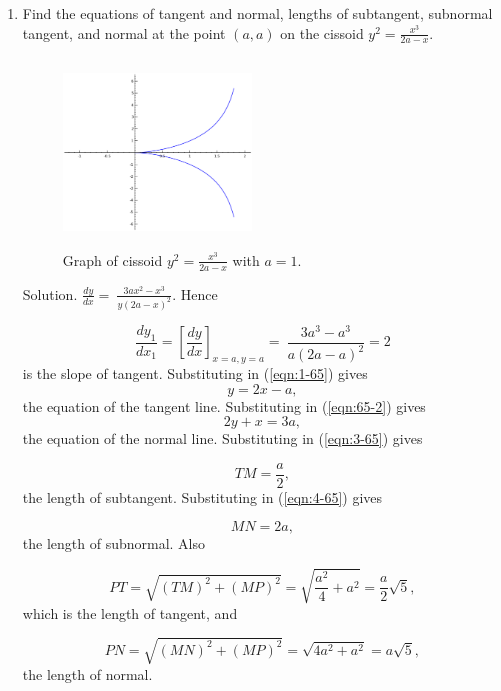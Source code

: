 \begin{enumerate}

\item
Find the equations of tangent and normal, lengths of subtangent, 
subnormal tangent, and normal at the point $(a,a)$ on the 
cissoid $y^2 = \frac{x^3}{2a - x}$.

\begin{figure}[h!]
\begin{minipage}{\textwidth}
\begin{center}
\includegraphics[height=5cm,width=5cm]{cissoid.eps}
\end{center}
\end{minipage}
\caption{Graph of cissoid $y^2 = \frac{x^3}{2a - x}$ with $a=1$.}
\label{fig:cissoid}
\end{figure}

Solution. 	
$\frac{dy}{dx} 	=\ \frac{3ax^2 - x^3}{y(2a - x)^2}$.
Hence 	

\[
\frac{dy_1}{dx_1} = \left [ \frac{dy}{dx} \right ]_{x = a, y = a} 	
=\ \frac{3a^3 - a^3}{a(2a - a)^2} = 2 
\]
is the slope of tangent. Substituting in (\ref{eqn:1-65}) 
gives
\[
  	y = 2x - a, 
\]
the equation of the tangent line.
Substituting in (\ref{eqn:65-2}) gives
\[
  	2y + x 	= 3a, 
\]
the equation of the normal line.
Substituting in (\ref{eqn:3-65}) gives

\[
TM 	= \frac{a}{2},
\]
the length of subtangent.
Substituting in (\ref{eqn:4-65}) gives

\[
  	MN 	= 2a,
\]
the length of subnormal.
Also 

\[
PT = \sqrt{(TM)^2 + (MP)^2} 
= \sqrt{\frac{a^2}{4} + a^2} 
= \frac{a}{2} \sqrt{5},
\]
which is the length of tangent,
and 

\[
PN = \sqrt{(MN)^2 + (MP)^2} 
= \sqrt{4a^2 + a^2} = a \sqrt{5},
\]
the length of normal.


\end{enumerate}
